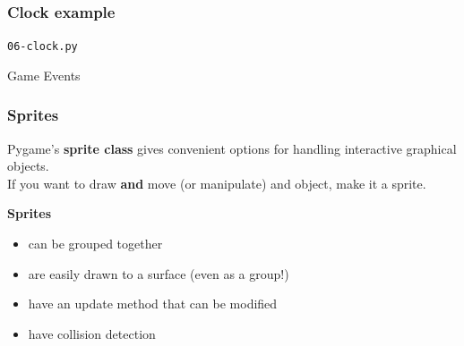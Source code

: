 \documentclass[handout]{beamer}   %
\begin{document}
\begin{frame}
\frametitle{Clock example}
\clockExamp
\pause
\medskip
\textcolor{tg}{\texttt{06-clock.py}}

\end{frame}













\begin{frame}[plain]
\begin{center}
\Huge
Game Events \\
\end{center}
\end{frame}



\begin{frame}
\frametitle{Sprites}

Pygame's \textbf{sprite class} gives convenient options for handling interactive graphical objects. \\
\medskip
\pause
If you want to draw \textbf{and} move (or manipulate) and object, make it a sprite.
\pause
\bigskip

\textbf{Sprites} 
\begin{itemize}
\item[] can be grouped together 
\item[] are easily drawn to a surface (even as a group!)
\item[] have an update method that can be modified
\item[] have collision detection
\end{itemize}
\end{frame}
\end{document}

